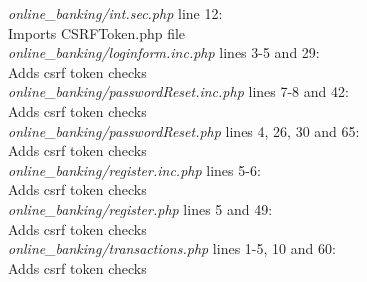 \documentclass[headsepline,footsepline,footinclude=false,oneside,fontsize=11pt,paper=a4,listof=totoc,bibliography=totoc]{scrbook} %
\begin{document}
\textit{online\_banking/int.sec.php} line 12:\\
Imports CSRFToken.php file\\

\textit{online\_banking/loginform.inc.php} lines 3-5 and 29:\\
Adds csrf token checks\\

\textit{online\_banking/passwordReset.inc.php} lines 7-8 and 42:\\
Adds csrf token checks\\

\textit{online\_banking/passwordReset.php} lines 4, 26, 30 and 65:\\
Adds csrf token checks\\

\textit{online\_banking/register.inc.php} lines 5-6:\\
Adds csrf token checks\\

\textit{online\_banking/register.php} lines 5 and 49:\\
Adds csrf token checks\\

\textit{online\_banking/transactions.php} lines 1-5, 10 and 60:\\
Adds csrf token checks\\
\end{document}
